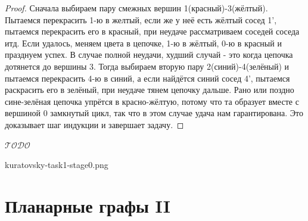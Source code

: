 \documentclass[a4paper,12pt]{article}
\theoremstyle{remark}
\def\iiTODO{\guillemotleft$\mathcal{TODO}$\guillemotright\textellipsis}
\begin{document}
\begin{proof}
	Сначала выбираем пару смежных вершин 1(красный)-3(жёлтый). Пытаемся перекрасить 1-ю в желтый, если же у неё есть жёлтый сосед 1', пытаемся перекрасить его в красный, при неудаче рассматриваем соседей соседа итд. Если удалось, меняем цвета в цепочке, 1-ю в жёлтый, 0-ю в красный и празднуем успех. В случае полной неудачи, худший случай - это когда цепочка дотянется до вершины 3. Тогда выбираем вторую пару 2(синий)-4(зелёный) и пытаемся перекрасить 4-ю в синий, а если найдётся синий сосед 4', пытаемся раскрасить его в зелёный, при неудаче тянем цепочку дальше. Рано или поздно сине-зелёная цепочка упрётся в красно-жёлтую, потому что та образует вместе с вершиной 0 замкнутый цикл, так что в этом случае удача нам гарантирована. Это доказывает шаг индукции и завершает задачу.
\end{proof}

\iiTODO


kuratovsky-task1-stage0.png

\section{Планарные графы II}
\end{document}
